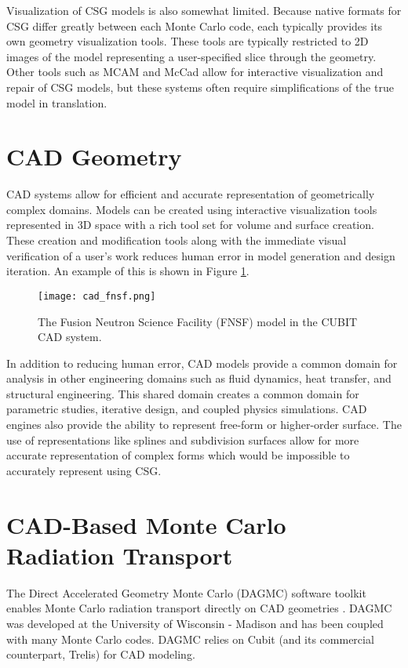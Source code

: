 Visualization of CSG models is also somewhat limited. Because native formats for
CSG differ greatly between each Monte Carlo code, each typically provides its
own geometry visualization tools. These tools are typically restricted to 2D
images of the model representing a user-specified slice through the
geometry. Other tools such as MCAM \cite{Liu_2005} and McCad
\cite{Tsigetamirat_2008} allow for interactive visualization and repair of CSG
models, but these systems often require simplifications of the true model in
translation.

\section{CAD Geometry}

CAD systems allow for efficient and accurate representation of geometrically
complex domains. Models can be created using interactive visualization tools
represented in 3D space with a rich tool set for volume and surface
creation. These creation and modification tools along with the immediate visual
verification of a user's work reduces human error in model generation and design
iteration. An example of this is shown in Figure \ref{fig:cad_fnsf}.

\begin{figure}[H]
  \centering
  \texttt{[image: cad\_fnsf.png]}
  \caption{The Fusion Neutron Science Facility (FNSF) model in the CUBIT \cite{Blacker_1994}
    CAD system.}
  \label{fig:cad_fnsf}
\end{figure}

In addition to reducing human error, CAD models provide a common domain for
analysis in other engineering domains such as fluid dynamics, heat transfer, and
structural engineering. This shared domain creates a common domain for
parametric studies, iterative design, and coupled physics simulations. CAD
engines also provide the ability to represent free-form or higher-order
surface. The use of representations like splines and subdivision surfaces allow
for more accurate representation of complex forms which would be impossible to
accurately represent using CSG.

\section{CAD-Based Monte Carlo Radiation Transport}

The Direct Accelerated Geometry Monte Carlo (DAGMC) software toolkit enables
Monte Carlo radiation transport directly on CAD geometries
\cite{Tautges_2009}. DAGMC was developed at the University of Wisconsin -
Madison and has been coupled with many Monte Carlo codes. DAGMC relies on
Cubit\cite{Blacker_1994} (and its commercial counterpart, Trelis) for CAD
modeling.

